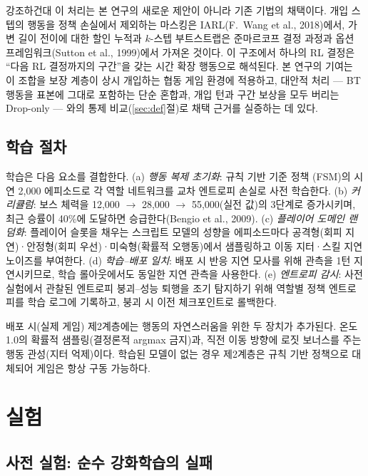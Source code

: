 \documentclass[12pt]{article}      %
\begin{document}
강조하건대 이 처리는 본 연구의 새로운 제안이 아니라 기존 기법의 채택이다. 개입
스텝의 행동을 정책 손실에서 제외하는 마스킹은 IARL(F.~Wang et al., 2018)에서,
가변 길이 전이에 대한 할인 누적과 $k$-스텝 부트스트랩은 준마르코프 결정 과정과
옵션 프레임워크(Sutton et al., 1999)에서 가져온 것이다. 이 구조에서 하나의 RL
결정은 ``다음 RL 결정까지의 구간''을 갖는 시간 확장 행동으로 해석된다. 본 연구의
기여는 이 조합을 보장 계층이 상시 개입하는 협동 게임 환경에 적용하고, 대안적
처리 --- BT 행동을 표본에 그대로 포함하는 단순 혼합과, 개입 턴과 구간 보상을 모두
버리는 Drop-only --- 와의 통제 비교(\ref{sec:def}절)로 채택 근거를 실증하는 데
있다.

\subsection{학습 절차}

학습은 다음 요소를 결합한다. (a) \emph{행동 복제 초기화}: 규칙 기반 기준 정책
(FSM)의 시연 2{,}000 에피소드로 각 역할 네트워크를 교차 엔트로피 손실로 사전
학습한다. (b) \emph{커리큘럼}: 보스 체력을 12{,}000 $\rightarrow$ 28{,}000
$\rightarrow$ 55{,}000(실전 값)의 3단계로 증가시키며, 최근 승률이 40\%에 도달하면
승급한다(Bengio et al., 2009). (c) \emph{플레이어 도메인 랜덤화}: 플레이어 슬롯을
채우는 스크립트 모델의 성향을 에피소드마다 공격형(회피 지연)·안정형(회피
우선)·미숙형(확률적 오행동)에서 샘플링하고 이동 지터·스킬 지연 노이즈를 부여한다.
(d) \emph{학습--배포 일치}: 배포 시 반응 지연 모사를 위해 관측을 1턴 지연시키므로,
학습 롤아웃에서도 동일한 지연 관측을 사용한다. (e) \emph{엔트로피 감시}: 사전
실험에서 관찰된 엔트로피 붕괴--성능 퇴행을 조기 탐지하기 위해 역할별 정책
엔트로피를 학습 로그에 기록하고, 붕괴 시 이전 체크포인트로 롤백한다.

배포 시(실제 게임) 제2계층에는 행동의 자연스러움을 위한 두 장치가 추가된다. 온도 1.0의
확률적 샘플링(결정론적 argmax 금지)과, 직전 이동 방향에 로짓 보너스를 주는 행동
관성(지터 억제)이다. 학습된 모델이 없는 경우 제2계층은 규칙 기반 정책으로
대체되어 게임은 항상 구동 가능하다.

\section{실험}
\label{sec:experiments}

\subsection{사전 실험: 순수 강화학습의 실패}
\end{document}
